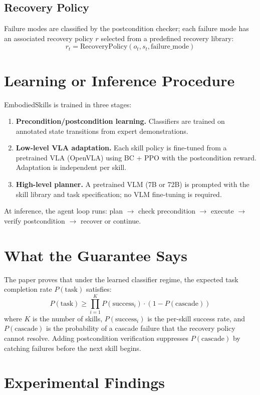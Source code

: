 \documentclass[10pt,twocolumn]{article}
\begin{document}
\subsection{Recovery Policy}

Failure modes are classified by the postcondition checker; each failure
mode has an associated recovery policy $r$ selected from a predefined
recovery library:
\[
  r_t = \mathrm{RecoveryPolicy}(o_t, s_t, \mathrm{failure\_mode})
\]

\section{Learning or Inference Procedure}

EmbodiedSkills is trained in three stages:
\begin{enumerate}[itemsep=2pt,parsep=0pt]
  \item \textbf{Precondition/postcondition learning.} Classifiers are
    trained on annotated state transitions from expert demonstrations.
  \item \textbf{Low-level VLA adaptation.} Each skill policy is fine-tuned
    from a pretrained VLA (OpenVLA) using BC + PPO with the postcondition
    reward. Adaptation is independent per skill.
  \item \textbf{High-level planner.} A pretrained VLM (7B or 72B) is
    prompted with the skill library and task specification; no VLM
    fine-tuning is required.
\end{enumerate}

At inference, the agent loop runs: plan $\to$ check precondition $\to$
execute $\to$ verify postcondition $\to$ recover or continue.

\section{What the Guarantee Says}

The paper proves that under the learned classifier regime, the expected
task completion rate $P(\mathrm{task})$ satisfies:
\[
  P(\mathrm{task}) \geq \prod_{i=1}^{K} P(\mathrm{success}_i)
  \cdot (1 - P(\mathrm{cascade}))
\]
where $K$ is the number of skills, $P(\mathrm{success}_i)$ is the
per-skill success rate, and $P(\mathrm{cascade})$ is the probability of
a cascade failure that the recovery policy cannot resolve. Adding
postcondition verification suppresses $P(\mathrm{cascade})$ by catching
failures before the next skill begins.

\section{Experimental Findings}
\end{document}
